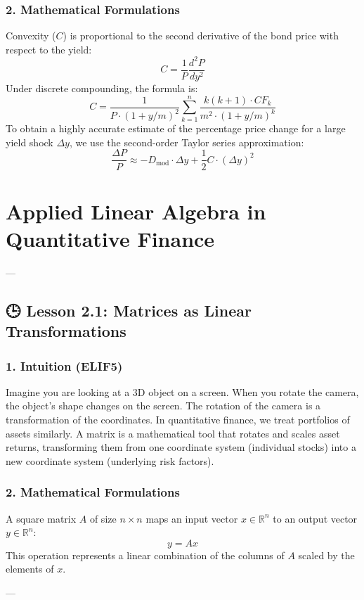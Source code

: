 \documentclass[11pt,oneside]{book}
\begin{document}
\subsection{2. Mathematical Formulations}
Convexity ($C$) is proportional to the second derivative of the bond price with respect to the yield:
$$C = \frac{1}{P} \frac{d^2 P}{dy^2}$$
Under discrete compounding, the formula is:
$$C = \frac{1}{P \cdot (1 + y/m)^2} \sum_{k=1}^{n} \frac{k(k+1) \cdot CF_k}{m^2 \cdot (1 + y/m)^k}$$
To obtain a highly accurate estimate of the percentage price change for a large yield shock $\Delta y$, we use the second-order Taylor series approximation:
$$\frac{\Delta P}{P} \approx -D_{\text{mod}} \cdot \Delta y + \frac{1}{2} C \cdot (\Delta y)^2$$


\newpage

\chapter{Applied Linear Algebra in Quantitative Finance}

---

\section{🕒 Lesson 2.1: Matrices as Linear Transformations}

\subsection{1. Intuition (ELIF5)}
Imagine you are looking at a 3D object on a screen. When you rotate the camera, the object's shape changes on the screen. The rotation of the camera is a transformation of the coordinates. In quantitative finance, we treat portfolios of assets similarly. A matrix is a mathematical tool that rotates and scales asset returns, transforming them from one coordinate system (individual stocks) into a new coordinate system (underlying risk factors).

\subsection{2. Mathematical Formulations}
A square matrix $A$ of size $n \times n$ maps an input vector $x \in \mathbb{R}^n$ to an output vector $y \in \mathbb{R}^n$:
$$y = A x$$
This operation represents a linear combination of the columns of $A$ scaled by the elements of $x$.

---
\end{document}

